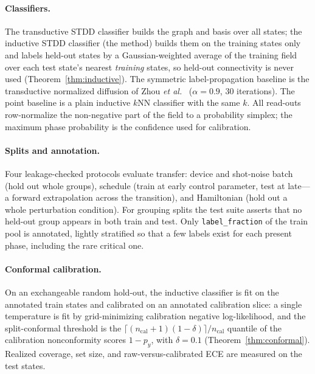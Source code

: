 \documentclass[aps,prresearch,reprint,amsmath,amssymb,nofootinbib,superscriptaddress,floatfix]{revtex4-2}
\theoremstyle{definition}
\theoremstyle{remark}
\theoremstyle{plain}
\begin{document}
\paragraph{Classifiers.}
The transductive STDD classifier builds the graph and basis over all states; the inductive STDD classifier
(the method) builds them on the training states only and labels held-out states by a Gaussian-weighted
average of the training field over each test state's nearest \emph{training} states, so held-out
connectivity is never used (Theorem~\ref{thm:inductive}). The symmetric label-propagation baseline is the
transductive normalized diffusion of Zhou \textit{et al.}~\cite{zhou2004local} ($\alpha=0.9$, $30$
iterations). The point baseline is a plain inductive $k$NN classifier with the same $k$. All read-outs
row-normalize the non-negative part of the field to a probability simplex; the maximum phase probability is
the confidence used for calibration.

\paragraph{Splits and annotation.}
Four leakage-checked protocols evaluate transfer: device and shot-noise batch (hold out whole groups),
schedule (train at early control parameter, test at late---a forward extrapolation across the transition),
and Hamiltonian (hold out a whole perturbation condition). For grouping splits the test suite asserts that
no held-out group appears in both train and test. Only \texttt{label\_fraction} of the train pool is
annotated, lightly stratified so that a few labels exist for each present phase, including the rare critical
one.

\paragraph{Conformal calibration.}
On an exchangeable random hold-out, the inductive classifier is fit on the annotated train states and
calibrated on an annotated calibration slice: a single temperature is fit by grid-minimizing calibration
negative log-likelihood, and the split-conformal threshold is the
$\lceil(n_{\mathrm{cal}}+1)(1-\delta)\rceil/n_{\mathrm{cal}}$ quantile of the calibration nonconformity
scores $1-p_y$, with $\delta=0.1$ (Theorem~\ref{thm:conformal}). Realized coverage, set size, and
raw-versus-calibrated ECE are measured on the test states.
\end{document}
